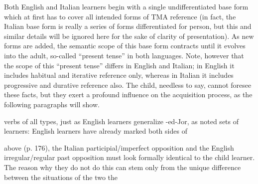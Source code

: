 Both English and Italian learners begin with a single undifferentiated base form which at first has to cover all intended forms of TMA reference (in fact, the Italian base form is really a series of forms differentiated for person, but this and similar details will be ignored here for the sake of clarity of presentation). As new forms are added, the semantic scope of this base form contracts until it evolves into the adult, so-called ``present tense'' in both languages. Note, however that the scope of this ``present tense'' differs in English and Italian; in English it includes habitual and iterative reference only, whereas in Italian it includes progressive and durative reference also. The child, needless to say, cannot foresee these facts, but they exert a profound influence on the acquisition process, as the following paragraphs will show.

verbs of all types, just as English learners generalize -ed-Jor, as noted
sets of learners: English learners have already marked both sides of

above (p. 176), the Italian participial/imperfect opposition and the
English irregular/regular past opposition must look formally identical to the child learner. The reason why they do not do this can stem only from the unique difference between the situations of the two the



